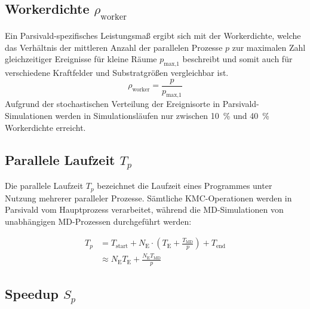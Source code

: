 \subsection{Workerdichte $\rho_\text{worker}$}

\continuehere

Ein Parsivald-spezifisches Leistungsmaß ergibt sich mit der Workerdichte, welche das Verhältnis der mittleren Anzahl der parallelen Prozesse $p$ zur maximalen Zahl gleichzeitiger Ereignisse für kleine Räume $p_\text{max,1}$ beschreibt und somit auch für verschiedene Kraftfelder und Substratgrößen vergleichbar ist.
\begin{equation}
  \rho_\text{worker} = \frac{p}{p_\text{max,1}}
\end{equation}
Aufgrund der stochastischen Verteilung der Ereignisorte in Parsivald-Simulationen werden in Simulationsläufen nur zwischen \SI{10}{\percent} und \SI{40}{\percent} Workerdichte erreicht.

\subsection{Parallele Laufzeit $T_p$}

Die parallele Laufzeit $T_p$ bezeichnet die Laufzeit eines Programmes unter Nutzung mehrerer paralleler Prozesse.
Sämtliche KMC-Operationen werden in Parsivald vom Hauptprozess verarbeitet, während die MD-Simulationen von unabhängigen MD-Prozessen durchgeführt werden:

\begin{align}
  T_p & = T_\text{start} + N_\text{E} \cdot (T_\text{E} + \frac{T_\text{MD}}{p}) + T_\text{end} \\
      & \approx N_\text{E} T_\text{E} + \frac{N_\text{E} T_\text{MD}}{p}
\end{align}

\subsection{Speedup $S_p$}


